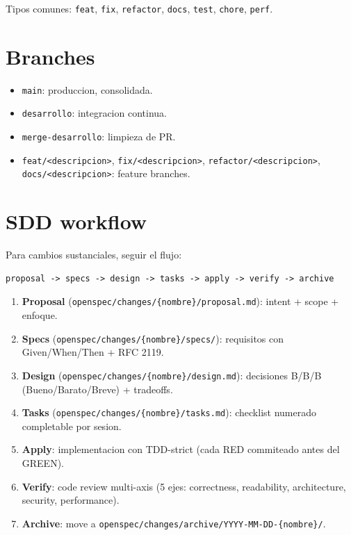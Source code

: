 \documentclass[11pt,a4paper,oneside]{report}
\begin{document}
Tipos comunes: \texttt{feat}, \texttt{fix}, \texttt{refactor}, \texttt{docs}, \texttt{test}, \texttt{chore}, \texttt{perf}.

\section{Branches}

\begin{itemize}[leftmargin=*]
    \item \texttt{main}: produccion, consolidada.
    \item \texttt{desarrollo}: integracion continua.
    \item \texttt{merge-desarrollo}: limpieza de PR.
    \item \texttt{feat/<descripcion>}, \texttt{fix/<descripcion>}, \texttt{refactor/<descripcion>}, \texttt{docs/<descripcion>}: feature branches.
\end{itemize}

\section{SDD workflow}

Para cambios sustanciales, seguir el flujo:

\begin{verbatim}
proposal -> specs -> design -> tasks -> apply -> verify -> archive
\end{verbatim}

\begin{enumerate}[leftmargin=*]
    \item \textbf{Proposal} (\texttt{openspec/changes/\{nombre\}/proposal.md}): intent + scope + enfoque.
    \item \textbf{Specs} (\texttt{openspec/changes/\{nombre\}/specs/}): requisitos con Given/When/Then + RFC 2119.
    \item \textbf{Design} (\texttt{openspec/changes/\{nombre\}/design.md}): decisiones B/B/B (Bueno/Barato/Breve) + tradeoffs.
    \item \textbf{Tasks} (\texttt{openspec/changes/\{nombre\}/tasks.md}): checklist numerado completable por sesion.
    \item \textbf{Apply}: implementacion con TDD-strict (cada RED commiteado antes del GREEN).
    \item \textbf{Verify}: code review multi-axis (5 ejes: correctness, readability, architecture, security, performance).
    \item \textbf{Archive}: move a \texttt{openspec/changes/archive/YYYY-MM-DD-\{nombre\}/}.
\end{enumerate}
\end{document}
